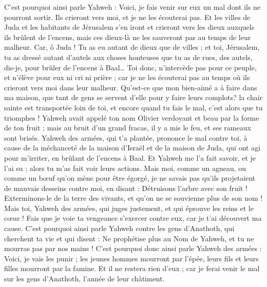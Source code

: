 \begin{multicols}{2}
C'est pourquoi ainsi parle Yahweh : Voici, je fais venir sur eux un mal dont ils ne pourront sortir. Ils crieront vers moi, et je ne les écouterai pas.
Et les villes de Juda et les habitants de Jérusalem s'en iront et crieront vers les dieux auxquels ils brûlent de l'encens, mais ces dieux-là ne les sauveront pas au temps de leur malheur.
Car, ô Juda ! Tu as eu autant de dieux que de villes ; et toi, Jérusalem, tu as dressé autant d'autels aux choses honteuses que tu as de rues, des autels, dis-je, pour brûler de l'encens à Baal…
Toi donc, n'intercède pas pour ce peuple, et n'élève pour eux ni cri ni prière ; car je ne les écouterai pas au temps où ils crieront vers moi dans leur malheur.
Qu'est-ce que mon bien-aimé a à faire dans ma maison, que tant de gens se servent d'elle pour y faire leurs complots? la chair sainte est transportée loin de toi, et encore quand tu fais le mal, c'est alors que tu triomphes !
Yahweh avait appelé ton nom Olivier verdoyant et beau par la forme de ton fruit ; mais au bruit d'un grand fracas, il y a mis le feu, et ses rameaux sont brisés.
Yahweh des armées, qui t'a plantée, prononce le mal contre toi, à cause de la méchanceté de la maison d'Israël et de la maison de Juda, qui ont agi pour m'irriter, en brûlant de l'encens à Baal.
Et Yahweh me l'a fait savoir, et je l'ai su ; alors tu m'as fait voir leurs actions.
Mais moi, comme un agneau, ou comme un bœuf qu'on mène pour être égorgé, je ne savais pas qu'ils projetaient de mauvais desseins contre moi, en disant : Détruisons l'arbre avec son fruit ! Exterminons-le de la terre des vivants, et qu'on ne se souvienne plus de son nom !
Mais toi, Yahweh des armées, qui juges justement, et qui éprouve les reins et le cœur ! Fais que je voie ta vengeance s'exercer contre eux, car je t'ai découvert ma cause.
C'est pourquoi ainsi parle Yahweh contre les gens d'Anathoth, qui cherchent ta vie et qui disent : Ne prophétise plus au Nom de Yahweh, et tu ne mourras pas par nos mains !
C'est pourquoi donc ainsi parle Yahweh des armées : Voici, je vais les punir ; les jeunes hommes mourront par l'épée, leurs fils et leurs filles mourront par la famine.
Et il ne restera rien d'eux ; car je ferai venir le mal sur les gens d'Anathoth, l'année de leur châtiment.

\end{multicols}
